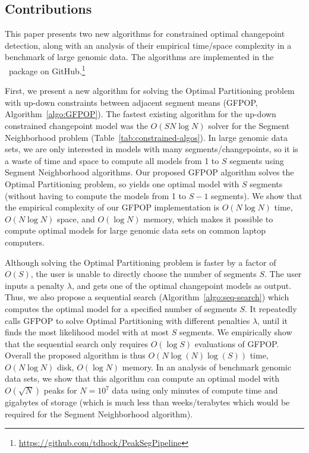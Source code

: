 \documentclass[article]{jss}
\newcommand{\R}{\proglang{R}}
\begin{document}


\subsection{Contributions}

This paper presents two new algorithms for constrained optimal
changepoint detection, along with an analysis of their empirical
time/space complexity in a benchmark of large genomic data. The
algorithms are implemented in the \R\ package
 on GitHub.\footnote{
\url{https://github.com/tdhock/PeakSegPipeline}
}

First, we present a new algorithm for solving the Optimal Partitioning
problem with up-down constraints between adjacent segment means
(GFPOP, Algorithm~\ref{algo:GFPOP}). The fastest existing algorithm
for the up-down constrained changepoint model was the
$O(SN\log N)$ solver for the Segment Neighborhood problem
(Table~\ref{tab:constrained-algos}). In large genomic data sets, we
are only interested in models with many segments/changepoints, so it
is a waste of time and space to compute all models from 1 to $S$
segments using Segment Neighborhood algorithms. Our proposed GFPOP
algorithm solves the Optimal Partitioning problem, so yields one
optimal model with $S$ segments (without having to compute the models
from 1 to $S-1$ segments). We show that the empirical complexity of
our GFPOP implementation is $O(N\log N)$ time, $O(N\log N)$ space, and
$O(\log N)$ memory, which makes it possible to compute optimal models
for large genomic data sets on common laptop computers.

Although solving the Optimal Partitioning problem is faster by a
factor of $O(S)$, the user is unable to directly choose the number of
segments $S$. The user inputs a penalty $\lambda$, and gets one of the
optimal changepoint models as output. Thus, we also propose a
sequential search (Algorithm~\ref{algo:seq-search}) which computes the
optimal model for a specified number of segments $S$. It repeatedly
calls GFPOP to solve Optimal Partitioning with different penalties
$\lambda$, until it finds the most likelihood model with at most $S$
segments. We empirically show that the sequential search only requires
$O(\log S)$ evaluations of GFPOP. Overall the proposed algorithm is
thus $O( N \log(N)\log(S))$ time, $O(N\log N)$ disk, $O(\log N)$
memory. In an analysis of benchmark genomic data sets, we show that
this algorithm can compute an optimal model with $O(\sqrt N)$ peaks
for $N=10^7$ data using only minutes of compute time and gigabytes of
storage (which is much less than weeks/terabytes which would be
required for the Segment Neighborhood algorithm). 
\end{document}
